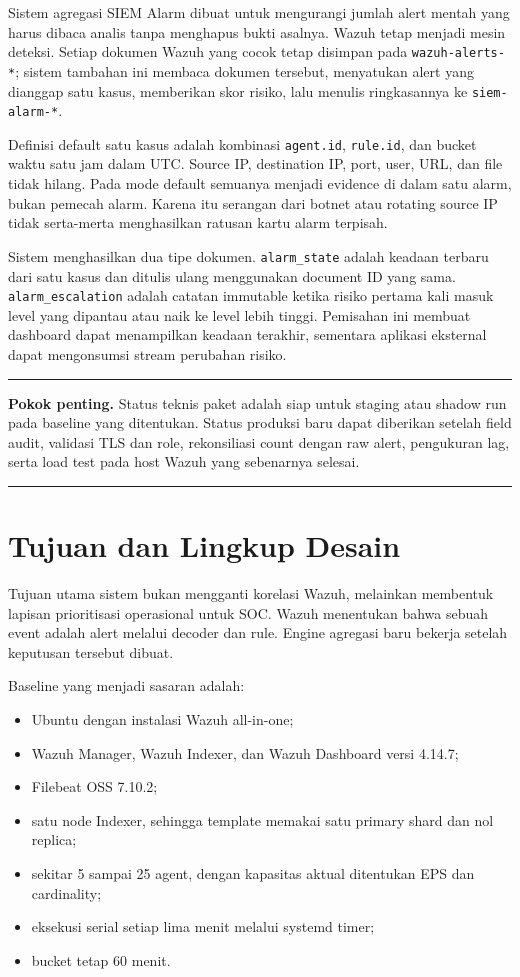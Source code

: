 \documentclass[11pt,a4paper,oneside]{report}
\DeclareRobustCommand{\code}[1]{\nolinkurl{#1}}
\newenvironment{keypoint}
  {\begin{center}\begin{minipage}{0.92\textwidth}\color{WazuhDark}\hrule\vspace{7pt}\textbf{Pokok penting.} }
  {\vspace{7pt}\hrule\end{minipage}\end{center}}
\begin{document}
Sistem agregasi SIEM Alarm dibuat untuk mengurangi jumlah alert mentah yang harus
dibaca analis tanpa menghapus bukti asalnya. Wazuh tetap menjadi mesin deteksi.
Setiap dokumen Wazuh yang cocok tetap disimpan pada \code{wazuh-alerts-*}; sistem
tambahan ini membaca dokumen tersebut, menyatukan alert yang dianggap satu kasus,
memberikan skor risiko, lalu menulis ringkasannya ke \code{siem-alarm-*}.

Definisi default satu kasus adalah kombinasi \code{agent.id}, \code{rule.id}, dan
bucket waktu satu jam dalam UTC. Source IP, destination IP, port, user, URL, dan
file tidak hilang. Pada mode default semuanya menjadi evidence di dalam satu alarm,
bukan pemecah alarm. Karena itu serangan dari botnet atau rotating source IP tidak
serta-merta menghasilkan ratusan kartu alarm terpisah.

Sistem menghasilkan dua tipe dokumen. \code{alarm_state} adalah keadaan terbaru
dari satu kasus dan ditulis ulang menggunakan document ID yang sama.
\code{alarm_escalation} adalah catatan immutable ketika risiko pertama kali masuk
level yang dipantau atau naik ke level lebih tinggi. Pemisahan ini membuat dashboard
dapat menampilkan keadaan terakhir, sementara aplikasi eksternal dapat mengonsumsi
stream perubahan risiko.

\begin{keypoint}
Status teknis paket adalah siap untuk staging atau shadow run pada baseline yang
ditentukan. Status produksi baru dapat diberikan setelah field audit, validasi TLS
dan role, rekonsiliasi count dengan raw alert, pengukuran lag, serta load test pada
host Wazuh yang sebenarnya selesai.
\end{keypoint}

\chapter{Tujuan dan Lingkup Desain}

Tujuan utama sistem bukan mengganti korelasi Wazuh, melainkan membentuk lapisan
prioritisasi operasional untuk SOC. Wazuh menentukan bahwa sebuah event adalah
alert melalui decoder dan rule. Engine agregasi baru bekerja setelah keputusan
tersebut dibuat.

Baseline yang menjadi sasaran adalah:

\begin{itemize}
  \item Ubuntu dengan instalasi Wazuh all-in-one;
  \item Wazuh Manager, Wazuh Indexer, dan Wazuh Dashboard versi 4.14.7;
  \item Filebeat OSS 7.10.2;
  \item satu node Indexer, sehingga template memakai satu primary shard dan nol replica;
  \item sekitar 5 sampai 25 agent, dengan kapasitas aktual ditentukan EPS dan cardinality;
  \item eksekusi serial setiap lima menit melalui systemd timer;
  \item bucket tetap 60 menit.
\end{itemize}
\end{document}
